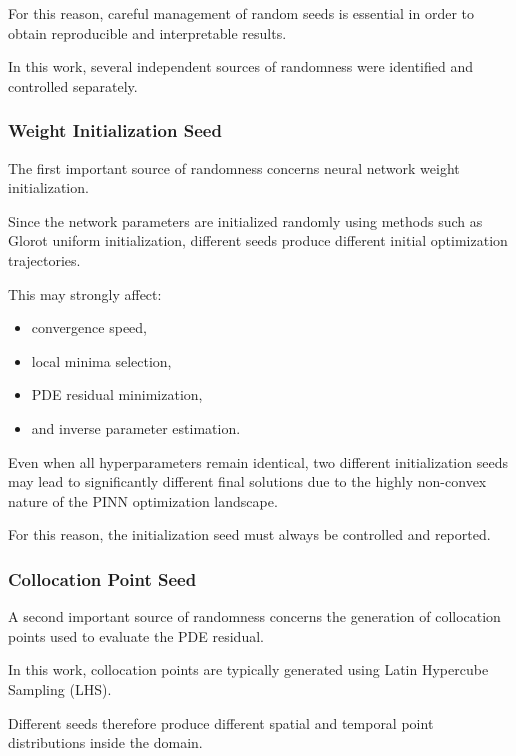 For this reason, careful management of random seeds is essential in order to obtain reproducible and interpretable results.

In this work, several independent sources of randomness were identified and controlled separately.

\subsubsection{Weight Initialization Seed}

The first important source of randomness concerns neural network weight initialization.

Since the network parameters are initialized randomly using methods such as Glorot uniform initialization, different seeds produce different initial optimization trajectories.

This may strongly affect:
\begin{itemize}
    \item convergence speed,
    \item local minima selection,
    \item PDE residual minimization,
    \item and inverse parameter estimation.
\end{itemize}

Even when all hyperparameters remain identical, two different initialization seeds may lead to significantly different final solutions due to the highly non-convex nature of the PINN optimization landscape.

For this reason, the initialization seed must always be controlled and reported.

\subsubsection{Collocation Point Seed}

A second important source of randomness concerns the generation of collocation points used to evaluate the PDE residual.

In this work, collocation points are typically generated using Latin Hypercube Sampling (LHS).

Different seeds therefore produce different spatial and temporal point distributions inside the domain.

